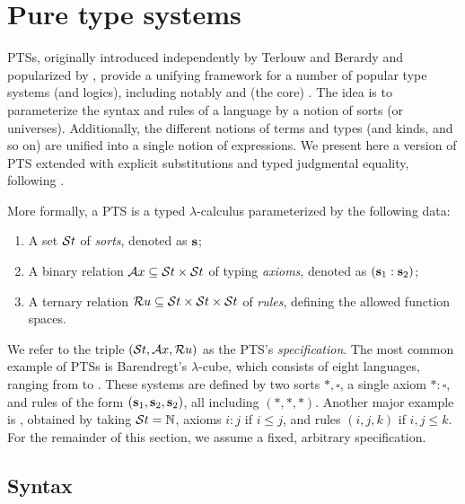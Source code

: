 \section{Pure type systems}

\Aclp{PTS}, originally introduced independently by Terlouw and Berardy and popularized by \citet{B91},
  provide a unifying framework for a number of popular type systems (and logics), including notably \coc and (the core) \mltt.
The idea is to parameterize the syntax and rules of a language by a notion of sorts (or universes).
Additionally, the different notions of terms and types (and kinds, and so on) are unified into a single notion of expressions.
We present here a version of \ac{PTS} extended with explicit substitutions and typed judgmental equality, following \citet{FP15}.

More formally, a \ac{PTS} is a typed $\lambda$-calculus parameterized by the following data:
\begin{enumerate}
\item A set $\mathcal{S}t$ of \textit{sorts}, denoted as $\textbf{s}$;
\item A binary relation $\mathcal{A}x \subseteq \mathcal{S}t \times \mathcal{S}t$ of typing \textit{axioms}, denoted as $(\textbf{s}_1 : \textbf{s}_2)$;
\item A ternary relation $\mathcal{R}u \subseteq \mathcal{S}t \times \mathcal{S}t \times \mathcal{S}t$ of \textit{rules}, defining the allowed function spaces.
\end{enumerate}
We refer to the triple $(\mathcal{S}t, \mathcal{A}x, \mathcal{R}u)$ as the \ac{PTS}'s \textit{specification}.
The most common example of \acp{PTS} is Barendregt's $\lambda$-cube, which consists of eight languages, ranging from \stlc to \coc.
These systems are defined by two sorts $*, \square$, a single axiom $* : \square$, and rules of the form $(\textbf{s}_1, \textbf{s}_2, \textbf{s}_2)$, all including $(*, *, *)$.
Another major example is \mltt, obtained by taking $\mathcal{S}t = \mathbb{N}$, axioms $i : j$ if $i \leq j$, and rules $(i, j, k)$ if $i, j \leq k$.
For the remainder of this section, we assume a fixed, arbitrary specification.


\subsection{Syntax}

